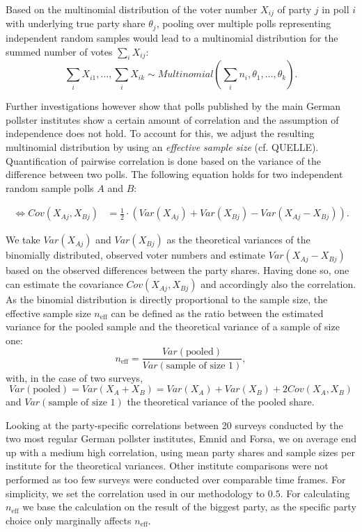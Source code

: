 \documentclass[twoside]{report}
\begin{document}
Based on the multinomial distribution of the voter number $X_{ij}$ of party $j$ in poll $i$ with underlying true party share $\theta_j$, pooling over multiple polls representing independent random samples would lead to a multinomial distribution for the summed number of votes $\sum\limits_i X_{ij}$:
$$
\sum\limits_i X_{i1},\ldots, \sum\limits_i X_{ik} \sim Multinomial(\sum\limits_i n_i,\theta_1,\ldots,\theta_k).
$$

Further investigations however show that polls published by the main German
pollster institutes show a certain amount of correlation and the assumption of
independence does not hold. To account for this, we adjust the resulting
multinomial distribution by using an \textit{effective sample size} (cf. QUELLE).
Quantification of pairwise correlation is done based on the variance of the
difference between two polls. The following equation holds for two independent
random sample polls $A$ and $B$:

$$
\begin{aligned}
\Leftrightarrow Cov(X_{Aj}, X_{Bj}) &= \frac{1}{2} \cdot \left(Var(X_{Aj}) + Var(X_{Bj}) - Var(X_{Aj} - X_{Bj}) \right).
\end{aligned}
$$

We take $Var(X_{Aj})$ and $Var(X_{Bj})$ as the theoretical variances of the binomially distributed, observed voter numbers and estimate $Var(X_{Aj} - X_{Bj})$ based on the observed differences between the party shares. Having done so, one can estimate the covariance $Cov(X_{Aj}, X_{Bj})$ and accordingly also the correlation. As the binomial distribution is directly proportional to the sample size, the effective sample size $n_{\text{eff}}$ can be defined as the ratio between the estimated variance for the pooled sample and the theoretical variance of a sample of size one:
$$
n_{\text{eff}} = \frac{Var(\text{pooled})}{Var(\text{sample of size 1})},
$$
with, in the case of two surveys,
$$
Var(\text{pooled}) = Var(X_A + X_B) = Var(X_A) + Var(X_B) + 2 Cov(X_A,X_B)
$$
and $Var(\text{sample of size 1})$ the theoretical variance of the pooled share.

Looking at the party-specific correlations between 20 surveys conducted by the two most regular German pollster institutes, Emnid and Forsa, we on average end up with a medium high correlation, using mean party shares and sample sizes per institute for the theoretical variances. Other institute comparisons were not performed as too few surveys were conducted over comparable time frames. For simplicity, we set the correlation used in our methodology to $0.5$. For calculating $n_{\text{eff}}$ we base the calculation on the result of the biggest party, as the specific party choice only marginally affects $n_{\text{eff}}$.
\end{document}
